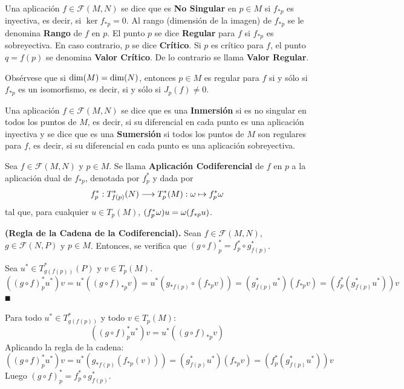 \documentclass[Cursovd_portada.tex]{subfiles}
\begin{document}
\begin{defi}
Una aplicación $f\in\mathcal{F}(M,N)$ se dice que es {\bf No Singular} en $p\in M$ si $f_{*p}$ es inyectiva, es
decir, si $\ker f_{*p}=0$. Al rango (dimensión de la imagen) de $f_{*p}$ se le denomina {\bf Rango} de $f$ en $p$.
El punto $p$ se dice {\bf Regular} para $f$ si $f_{*p}$ es sobreyectiva. En caso contrario, $p$ se dice {\bf
Crítico}. Si $p$ es crítico para $f$, el punto $q=f(p)$ se denomina {\bf Valor Crítico}. De lo contrario se llama
{\bf Valor Regular}.
\end{defi}
Obsérvese que si ${\rm dim}(M)={\rm dim}(N)$, entonces $p\in M$ es regular para $f$ si y sólo si $f_{*p}$ es un
isomorfismo, es decir, si y sólo si $J_p(f)\neq 0$.
\begin{defi}
Una aplicación $f\in\mathcal{F}(M,N)$ se dice que es una {\bf Inmersión} si es no singular en todos los puntos de
$M$, es decir, si su diferencial en cada punto es una aplicación inyectiva y se dice que es una {\bf Sumersión} si
todos los puntos de $M$ son regulares para $f$, es decir, si su diferencial en cada punto es una aplicación
sobreyectiva.
\end{defi}
\begin{defi}
Sea $f\in\mathcal{F}(M,N)$ y $p\in M$. Se llama {\bf Aplicación Co\-di\-fe\-ren\-cial} de $f$ en $p$ a la
aplicación dual de $f_{*p}$, denotada por $f_p^*$ y dada por
$$f_p^*:T_{f(p)}^*(N)\longrightarrow T_p^*(M):\omega\mapsto f_p^*\omega$$
tal que, para cualquier $u\in T_p(M)$, $(f_p^*\omega)u=\omega(f_{*p}u)$.
\end{defi}
\begin{prop}
{\bf (Regla de la Cadena de la Codiferencial).} Sean $f\in\mathcal{F}(M,N)$, $g\in\mathcal{F}(N,P)$ y $p\in M$.
Entonces, se verifica que $(g\circ f)_p^*=f_p^*\circ g_{f(p)}^*$.
\end{prop}
\begin{dem}
Sea $u^*\in T^*_{g(f(p))}(P)$ y $v\in T_p(M)$.  $$((g\circ f)^*_p u^*)v=u^*((g\circ f)_{*p}v)=u^*(g_{*f(p)}\circ (f_{*p}v))=(g^*_{f(p)}u^*)(f_{*p}v)=(f^*_p(g^*_{f(p)}u^*))v$$ $\QED$
\end{dem}

\begin{dem}
Para todo $u^* \in T^*_{g(f(p))}$ y todo $v \in T_p(M)$:
\[ ((g \circ f)^*_p u^*)v = u^*((g \circ f)_{*p} v) \]
Aplicando la regla de la cadena:
\[ ((g \circ f)^*_p u^*)v = u^*( g_{*f(p)} (f_{*p}(v))) = (g_{f(p)}^*u^*) (f_{*p} v) = (f_p^*(g_{f(p)}^*u^*))v\]
Luego $(g \circ f)^*_p  = f_p^* \circ g_{f(p)}^*$.
\end{dem}
\end{document}
